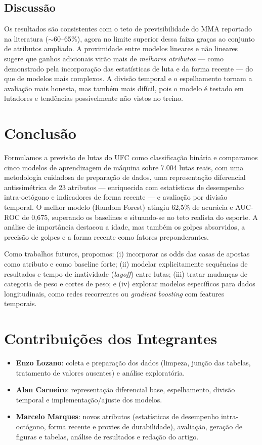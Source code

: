 \documentclass[10pt]{article}
\begin{document}
\subsection{Discussão}
Os resultados são consistentes com o teto de previsibilidade do MMA reportado na
literatura ($\sim$60--65\%), agora no limite superior dessa faixa graças ao
conjunto de atributos ampliado. A proximidade entre modelos lineares e não
lineares sugere que ganhos adicionais virão mais de \emph{melhores atributos}
--- como demonstrado pela incorporação das estatísticas de luta e da forma
recente --- do que de modelos mais complexos. A divisão temporal e o
espelhamento tornam a avaliação mais honesta, mas também mais difícil, pois o
modelo é testado em lutadores e tendências possivelmente não vistos no treino.

\section{Conclusão}
Formulamos a previsão de lutas do UFC como classificação binária e comparamos
cinco modelos de aprendizagem de máquina sobre 7.004 lutas reais, com uma
metodologia cuidadosa de preparação de dados, uma representação diferencial
antissimétrica de 23 atributos --- enriquecida com estatísticas de desempenho
intra-octógono e indicadores de forma recente --- e avaliação por divisão
temporal. O melhor modelo (Random Forest) atingiu 62,5\% de acurácia e AUC-ROC
de 0,675, superando os baselines e situando-se no teto realista do esporte. A
análise de importância destacou a idade, mas também os golpes absorvidos, a
precisão de golpes e a forma recente como fatores preponderantes.

Como trabalhos futuros, propomos: (i) incorporar as odds das casas de apostas
como atributo e como baseline forte; (ii) modelar explicitamente sequências de
resultados e tempo de inatividade (\emph{layoff}) entre lutas; (iii) tratar
mudanças de categoria de peso e cortes de peso; e (iv) explorar modelos
específicos para dados longitudinais, como redes recorrentes ou \emph{gradient
boosting} com features temporais.

\section*{Contribuições dos Integrantes}
\begin{itemize}
  \item \textbf{Enzo Lozano}: coleta e preparação dos dados (limpeza,
        junção das tabelas, tratamento de valores ausentes) e análise
        exploratória.
  \item \textbf{Alan Carneiro}: representação diferencial base, espelhamento,
        divisão temporal e implementação/ajuste dos modelos.
  \item \textbf{Marcelo Marques}: novos atributos (estatísticas de desempenho
        intra-octógono, forma recente e proxies de durabilidade), avaliação,
        geração de figuras e tabelas, análise de resultados e redação do artigo.
\end{itemize}



\end{document}
